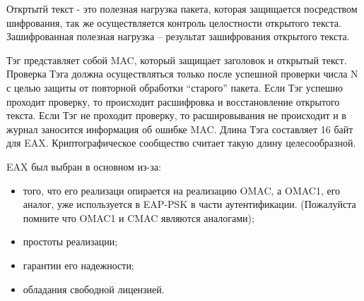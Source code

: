 Откртытй текст - это полезная нагрузка пакета, которая защищается посредством шифрования, так же осуществляется контроль целостности открытого текста. Зашифрованная полезная нагрузка -- результат зашифрования открытого текста.

Тэг представляет собой MAC, который защищает заголовок и открытый текст. Проверка Тэга должна осуществляться только после успешной проверки числа N с целью защиты от повторной обработки ``старого'' пакета. Если Тэг успешно проходит проверку, то происходит расшифровка и восстановление открытого текста. Если Тэг не проходит проверку, то расшировывания не происходит и в журнал заносится информация об ошибке MAC. Длина Тэга составляет 16 байт для EAX. Криптографическое сообщество считает такую длину целесообразной.

EAX был выбран в основном из-за:

\begin{itemize}
\item того, что его реализаци опирается на реализацию OMAC, а OMAC1, его аналог, уже используется в EAP-PSK в части аутентификации. (Пожалуйста помните что OMAC1 и CMAC являются аналогами);
\item простоты реализации;
\item гарантии его надежности;
\item обладания свободной лицензией.
\end{itemize}

